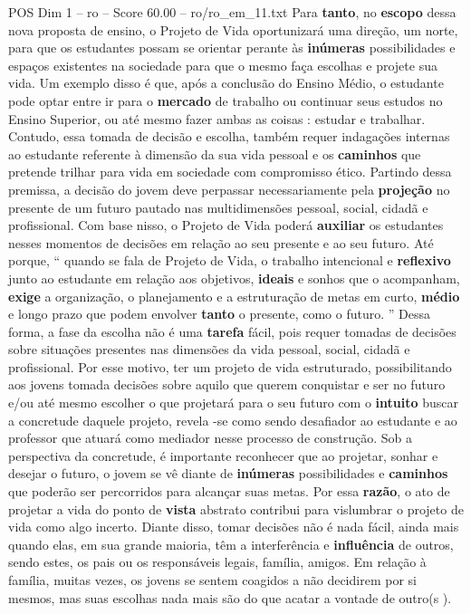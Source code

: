 \begin{textsample}{POS Dim 1 – ro – Score 60.00 – ro/ro\_em\_11.txt}
Para \textbf{tanto}, no \textbf{escopo} dessa nova proposta de ensino, o Projeto de Vida oportunizará uma direção, um norte, para que os estudantes possam se orientar perante às \textbf{inúmeras} possibilidades e espaços existentes na sociedade para que o mesmo faça escolhas e projete sua vida.
Um exemplo disso é que, após a conclusão do Ensino Médio, o estudante pode optar entre ir para o \textbf{mercado} de trabalho ou continuar seus estudos no Ensino Superior, ou até mesmo fazer ambas as coisas : estudar e trabalhar.
Contudo, essa tomada de decisão e escolha, também requer indagações internas ao estudante referente à dimensão da sua vida pessoal e os \textbf{caminhos} que pretende trilhar para vida em sociedade com compromisso ético.
Partindo dessa premissa, a decisão do jovem deve perpassar necessariamente pela \textbf{projeção} no presente de um futuro pautado nas multidimensões pessoal, social, cidadã e profissional.
Com base nisso, o Projeto de Vida poderá \textbf{auxiliar} os estudantes nesses momentos de decisões em relação ao seu presente e ao seu futuro.
Até porque, “ quando se fala de Projeto de Vida, o trabalho intencional e \textbf{reflexivo} junto ao estudante em relação aos objetivos, \textbf{ideais} e sonhos que o acompanham, \textbf{exige} a organização, o planejamento e a estruturação de metas em curto, \textbf{médio} e longo prazo que podem envolver \textbf{tanto} o presente, como o futuro. ” Dessa forma, a fase da escolha não é uma \textbf{tarefa} fácil, pois requer tomadas de decisões sobre situações presentes nas dimensões da vida pessoal, social, cidadã e profissional.
Por esse motivo, ter um projeto de vida estruturado, possibilitando aos jovens tomada decisões sobre aquilo que querem conquistar e ser no futuro e/ou até mesmo escolher o que projetará para o seu futuro com o \textbf{intuito} buscar a concretude daquele projeto, revela -se como sendo desafiador ao estudante e ao professor que atuará como mediador nesse processo de construção.
Sob a perspectiva da concretude, é importante reconhecer que ao projetar, sonhar e desejar o futuro, o jovem se vê diante de \textbf{inúmeras} possibilidades e \textbf{caminhos} que poderão ser percorridos para alcançar suas metas.
Por essa \textbf{razão}, o ato de projetar a vida do ponto de \textbf{vista} abstrato contribui para vislumbrar o projeto de vida como algo incerto.
Diante disso, tomar decisões não é nada fácil, ainda mais quando elas, em sua grande maioria, têm a interferência e \textbf{influência} de outros, sendo estes, os pais ou os responsáveis legais, família, amigos.
Em relação à família, muitas vezes, os jovens se sentem coagidos a não decidirem por si mesmos, mas suas escolhas nada mais são do que acatar a vontade de outro(s ).

\end{textsample}
